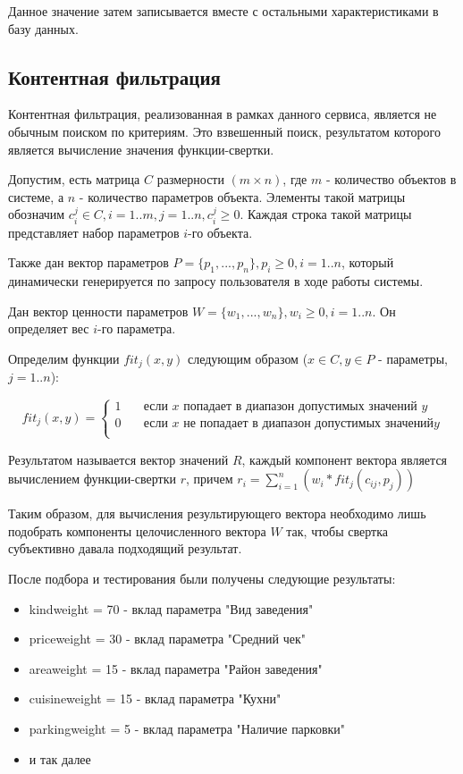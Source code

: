 Данное значение затем записывается вместе с остальными характеристиками в базу данных.

\subsection{Контентная фильтрация}

Контентная фильтрация, реализованная в рамках данного сервиса, является не обычным поиском по критериям. Это взвешенный поиск, результатом которого является вычисление значения функции-свертки.

Допустим, есть матрица $C$ размерности $(m \times n)$, где $m$ - количество объектов в системе, а $n$ - количество параметров объекта. Элементы такой матрицы обозначим $c_{i}^{j} \in C, i=1..m , j=1..n, c_{i}^{j} \geq 0$. Каждая строка такой матрицы представляет набор параметров $i$-го объекта.

Также дан вектор параметров $P=\{p_1, ... , p_n\}, p_i \geq 0, i=1..n$, который динамически генерируется по запросу пользователя в ходе работы системы.

Дан вектор ценности параметров $W=\{ w_1, ... , w_n \}, w_i \geq 0, i = 1..n $. Он определяет вес $i$-го параметра.

Определим функции $fit_j(x,y)$ следующим образом ($x \in C, y \in P $ - параметры, $j = 1..n$): 
 
 \[ fit_j(x,y) =
 \begin{cases}
 1       & \quad \text{если } x \text{ попадает в диапазон допустимых значений } y\\
 0      & \quad \text{если } x \text{ не попадает в диапазон допустимых значений} y\\
 \end{cases}
 \]
 
 Результатом называется вектор значений $R$, каждый компонент вектора является вычислением функции-свертки $r$, причем
 $r_i = \sum_{i=1}^{n}(w_i * fit_j(c_{ij}, p_j))$
 
 Таким образом, для вычисления результирующего вектора необходимо лишь подобрать компоненты целочисленного вектора $W$ так, чтобы свертка субъективно давала подходящий результат. 
 
 После подбора и тестирования были получены следующие результаты:
 
 \begin{itemize}
 	\item kindweight = 70   - вклад параметра "Вид заведения"
 	\item priceweight = 30   - вклад параметра "Средний чек"
 	\item areaweight = 15    - вклад параметра "Район заведения"
 	\item cuisineweight = 15   - вклад параметра "Кухни"
 	\item parkingweight = 5    - вклад параметра "Наличие парковки"
 	\item и так далее
 \end{itemize}

